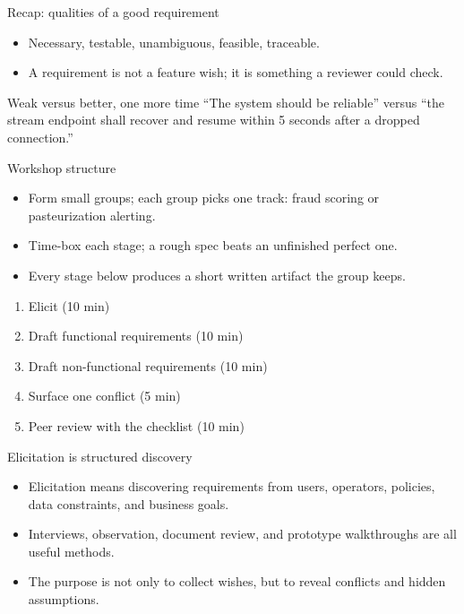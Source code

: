 \begin{frame}{Recap: qualities of a good requirement}
\begin{itemize}
\item Necessary, testable, unambiguous, feasible, traceable.
\item A requirement is not a feature wish; it is something a reviewer could check.
\end{itemize}
\begin{block}{Weak versus better, one more time}
``The system should be reliable'' versus ``the stream endpoint shall recover and resume within 5 seconds after a dropped connection.''
\end{block}
\coursefooter
\end{frame}

\begin{frame}{Workshop structure}
\begin{itemize}
\item Form small groups; each group picks one track: fraud scoring or pasteurization alerting.
\item Time-box each stage; a rough spec beats an unfinished perfect one.
\item Every stage below produces a short written artifact the group keeps.
\end{itemize}
\begin{enumerate}
\item Elicit (10 min)
\item Draft functional requirements (10 min)
\item Draft non-functional requirements (10 min)
\item Surface one conflict (5 min)
\item Peer review with the checklist (10 min)
\end{enumerate}
\coursefooter
\end{frame}

\begin{frame}{Elicitation is structured discovery}
\begin{itemize}
\item Elicitation means discovering requirements from users, operators, policies, data constraints, and business goals.
\item Interviews, observation, document review, and prototype walkthroughs are all useful methods.
\item The purpose is not only to collect wishes, but to reveal conflicts and hidden assumptions.
\end{itemize}
\coursefooter
\end{frame}

